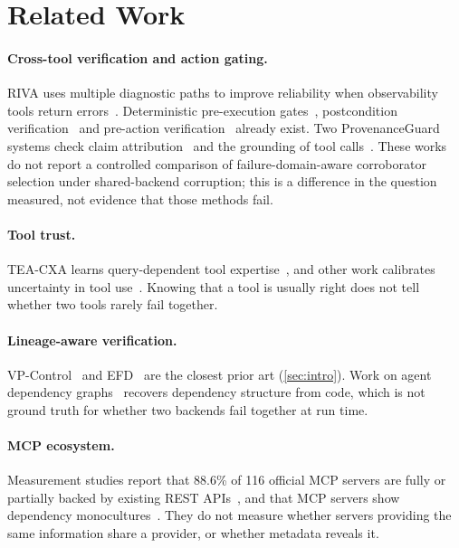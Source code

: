 \section{Related Work}\label{sec:related}

\paragraph{Cross-tool verification and action gating.} RIVA uses multiple diagnostic paths to improve reliability when observability tools return errors~\cite{riva26}. Deterministic pre-execution gates~\cite{rlvm26}, postcondition verification~\cite{vtc26} and pre-action verification~\cite{lbyl26} already exist. Two ProvenanceGuard systems check claim attribution~\cite{pgf26} and the grounding of tool calls~\cite{pga26}. These works do not report a controlled comparison of failure-domain-aware corroborator selection under shared-backend corruption; this is a difference in the question measured, not evidence that those methods fail.

\paragraph{Tool trust.} TEA-CXA learns query-dependent tool expertise~\cite{tea26}, and other work calibrates uncertainty in tool use~\cite{pc24}. Knowing that a tool is usually right does not tell whether two tools rarely fail together.

\paragraph{Lineage-aware verification.} VP-Control~\cite{vpc26} and EFD~\cite{efd26} are the closest prior art (\cref{sec:intro}). Work on agent dependency graphs~\cite{grade26,af26} recovers dependency structure from code, which is not ground truth for whether two backends fail together at run time.

\paragraph{MCP ecosystem.} Measurement studies report that 88.6\% of 116 official MCP servers are fully or partially backed by existing REST APIs~\cite{mcprest25}, and that MCP servers show dependency monocultures~\cite{mcpmeas25}. They do not measure whether servers providing the same information share a provider, or whether metadata reveals it.
